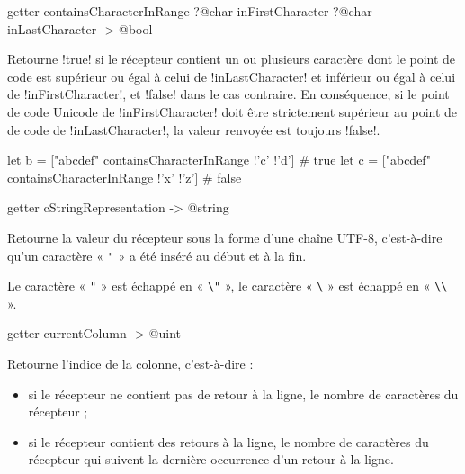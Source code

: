 \begin{galgasbox}
getter containsCharacterInRange
  ?@char inFirstCharacter
  ?@char inLastCharacter
  -> @bool
\end{galgasbox}

Retourne \ggs!true! si le récepteur contient un ou plusieurs caractère dont le point de code est supérieur ou égal à celui de \ggs!inLastCharacter! et inférieur ou égal à celui de \ggs!inFirstCharacter!, et \ggs!false! dans le cas contraire. En conséquence, si le point de code Unicode de \ggs!inFirstCharacter! doit être strictement supérieur au point de de code de \ggs!inLastCharacter!, la valeur renvoyée est toujours \ggs!false!.

\begin{galgas}
let b = ["abcdef" containsCharacterInRange !'c' !'d'] # true
let c = ["abcdef" containsCharacterInRange !'x' !'z'] # false
\end{galgas}









\begin{galgasbox}
getter cStringRepresentation -> @string
\end{galgasbox}

Retourne la valeur du récepteur sous la forme d'une chaîne UTF-8, c'est-à-dire qu'un caractère « \texttt{"} » a été inséré au début et à la fin.

Le caractère « \texttt{"} » est échappé en « \texttt{\textbackslash"} », le caractère « \texttt{\textbackslash} » est échappé en « \texttt{\textbackslash\textbackslash} ».








\begin{galgasbox}
getter currentColumn -> @uint
\end{galgasbox}

Retourne l'indice de la colonne, c'est-à-dire :
\begin{itemize}
\item si le récepteur ne contient pas de retour à la ligne, le nombre de caractères du récepteur ;
\item si le récepteur contient des retours à la ligne, le nombre de caractères du récepteur qui suivent la dernière occurrence d'un retour à la ligne.
\end{itemize}







